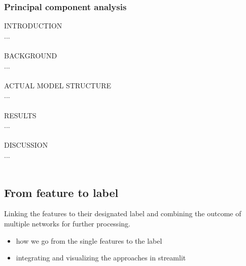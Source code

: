 \subsubsection{Principal component analysis}

INTRODUCTION \\
... \\
\\
BACKGROUND \\
... \\
\\
ACTUAL MODEL STRUCTURE \\
... \\
\\
RESULTS \\
... \\
\\
DISCUSSION \\
... \\
\\

\subsection{From feature to label}

Linking the features to their designated label and combining the outcome of multiple networks for further processing.

\begin{itemize}
\item how we go from the single features to the label
\item integrating and visualizing the approaches in streamlit
\end{itemize}
